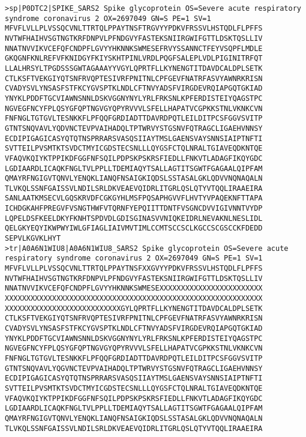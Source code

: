 \documentclass[en,black,12pt,normal]{elegantnote}
\begin{document}
\begin{lstlisting}
>sp|P0DTC2|SPIKE_SARS2 Spike glycoprotein OS=Severe acute respiratory syndrome coronavirus 2 OX=2697049 GN=S PE=1 SV=1
MFVFLVLLPLVSSQCVNLTTRTQLPPAYTNSFTRGVYYPDKVFRSSVLHSTQDLFLPFFS
NVTWFHAIHVSGTNGTKRFDNPVLPFNDGVYFASTEKSNIIRGWIFGTTLDSKTQSLLIV
NNATNVVIKVCEFQFCNDPFLGVYYHKNNKSWMESEFRVYSSANNCTFEYVSQPFLMDLE
GKQGNFKNLREFVFKNIDGYFKIYSKHTPINLVRDLPQGFSALEPLVDLPIGINITRFQT
LLALHRSYLTPGDSSSGWTAGAAAYYVGYLQPRTFLLKYNENGTITDAVDCALDPLSETK
CTLKSFTVEKGIYQTSNFRVQPTESIVRFPNITNLCPFGEVFNATRFASVYAWNRKRISN
CVADYSVLYNSASFSTFKCYGVSPTKLNDLCFTNVYADSFVIRGDEVRQIAPGQTGKIAD
YNYKLPDDFTGCVIAWNSNNLDSKVGGNYNYLYRLFRKSNLKPFERDISTEIYQAGSTPC
NGVEGFNCYFPLQSYGFQPTNGVGYQPYRVVVLSFELLHAPATVCGPKKSTNLVKNKCVN
FNFNGLTGTGVLTESNKKFLPFQQFGRDIADTTDAVRDPQTLEILDITPCSFGGVSVITP
GTNTSNQVAVLYQDVNCTEVPVAIHADQLTPTWRVYSTGSNVFQTRAGCLIGAEHVNNSY
ECDIPIGAGICASYQTQTNSPRRARSVASQSIIAYTMSLGAENSVAYSNNSIAIPTNFTI
SVTTEILPVSMTKTSVDCTMYICGDSTECSNLLLQYGSFCTQLNRALTGIAVEQDKNTQE
VFAQVKQIYKTPPIKDFGGFNFSQILPDPSKPSKRSFIEDLLFNKVTLADAGFIKQYGDC
LGDIAARDLICAQKFNGLTVLPPLLTDEMIAQYTSALLAGTITSGWTFGAGAALQIPFAM
QMAYRFNGIGVTQNVLYENQKLIANQFNSAIGKIQDSLSSTASALGKLQDVVNQNAQALN
TLVKQLSSNFGAISSVLNDILSRLDKVEAEVQIDRLITGRLQSLQTYVTQQLIRAAEIRA
SANLAATKMSECVLGQSKRVDFCGKGYHLMSFPQSAPHGVVFLHVTYVPAQEKNFTTAPA
ICHDGKAHFPREGVFVSNGTHWFVTQRNFYEPQIITTDNTFVSGNCDVVIGIVNNTVYDP
LQPELDSFKEELDKYFKNHTSPDVDLGDISGINASVVNIQKEIDRLNEVAKNLNESLIDL
QELGKYEQYIKWPWYIWLGFIAGLIAIVMVTIMLCCMTSCCSCLKGCCSCGSCCKFDEDD
SEPVLKGVKLHYT
>tr|A0A6N1WIU8|A0A6N1WIU8_SARS2 Spike glycoprotein OS=Severe acute respiratory syndrome coronavirus 2 OX=2697049 GN=S PE=1 SV=1
MFVFLVLLPLVSSQCVNLTTRTQLPPAYTNSFXXGVYYPDKVFRSSVLHSTQDLFLPFFS
NVTWFHAIHVSGTNGTKRFDNPVLPFNDGVYFASTEKSNIIRGWIFGTTLDSKTQSLLIV
NNATNVVIKVCEFQFCNDPFLGVYYHKNNKSWMESEXXXXXXXXXXXXXXXXXXXXXXXX
XXXXXXXXXXXXXXXXXXXXXXXXXXXXXXXXXXXXXXXXXXXXXXXXXXXXXXXXXXXX
XXXXXXXXXXXXXXXXXXXXXXXXXXXGYLQPRTFLLKYNENGTITDAVDCALDPLSETK
CTLKSFTVEKGIYQTSNFRVQPTESIVRFPNITNLCPFGEVFNATRFASVYAWNRKRISN
CVADYSVLYNSASFSTFKCYGVSPTKLNDLCFTNVYADSFVIRGDEVRQIAPGQTGKIAD
YNYKLPDDFTGCVIAWNSNNLDSKVGGNYNYLYRLFRKSNLKPFERDISTEIYQAGSTPC
NGVEGFNCYFPLQSYGFQPTNGVGYQPYRVVVLSFELLHAPATVCGPKKSTNLVKNKCVN
FNFNGLTGTGVLTESNKKFLPFQQFGRDIADTTDAVRDPQTLEILDITPCSFGGVSVITP
GTNTSNQVAVLYQGVNCTEVPVAIHADQLTPTWRVYSTGSNVFQTRAGCLIGAEHVNNSY
ECDIPIGAGICASYQTQTNSPRRARSVASQSIIAYTMSLGAENSVAYSNNSIAIPTNFTI
SVTTEILPVSMTKTSVDCTMYICGDSTECSNLLLQYGSFCTQLNRALTGIAVEQDKNTQE
VFAQVKQIYKTPPIKDFGGFNFSQILPDPSKPSKRSFIEDLLFNKVTLADAGFIKQYGDC
LGDIAARDLICAQKFNGLTVLPPLLTDEMIAQYTSALLAGTITSGWTFGAGAALQIPFAM
QMAYRFNGIGVTQNVLYENQKLIANQFNSAIGKIQDSLSSTASALGKLQDVVNQNAQALN
TLVKQLSSNFGAISSVLNDILSRLDKVEAEVQIDRLITGRLQSLQTYVTQQLIRAAEIRA

\end{lstlisting}
\end{document}
